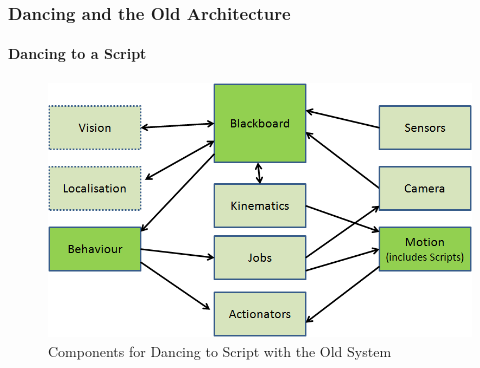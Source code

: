 \documentclass{beamer}
\begin{document}
	\begin{frame}
		\frametitle{Dancing and the Old Architecture}
		\framesubtitle{Dancing to a Script}
		\begin{figure}
			\centering
			\includegraphics[scale=.45]{Presentation_Images/dance_script_old_arc.png}
			\caption{Components for Dancing to Script with the Old System}
		\end{figure}
	\end{frame}	
\end{document}
